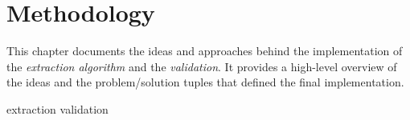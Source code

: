 \chapter{Methodology}
\label{methodology}

This chapter documents the ideas and approaches behind the implementation of the \textit{extraction algorithm} and the \textit{validation}. It provides a high-level overview of the ideas and the problem/solution tuples that defined the final implementation.

{extraction}
{validation}